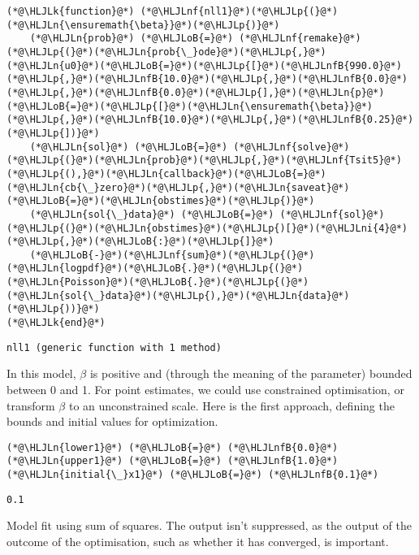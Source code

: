 \documentclass[12pt,a4paper]{article}
\newcommand{\HLJLk}[1]{\textcolor[RGB]{148,91,176}{\textbf{#1}}}
\newcommand{\HLJLn}[1]{#1}
\newcommand{\HLJLnf}[1]{\textcolor[RGB]{66,102,213}{#1}}
\newcommand{\HLJLnfB}[1]{\textcolor[RGB]{59,151,46}{#1}}
\newcommand{\HLJLni}[1]{\textcolor[RGB]{59,151,46}{#1}}
\newcommand{\HLJLoB}[1]{\textcolor[RGB]{102,102,102}{\textbf{#1}}}
\newcommand{\HLJLp}[1]{#1}
\begin{document}
\begin{lstlisting}
(*@\HLJLk{function}@*) (*@\HLJLnf{nll1}@*)(*@\HLJLp{(}@*)(*@\HLJLn{\ensuremath{\beta}}@*)(*@\HLJLp{)}@*)
    (*@\HLJLn{prob}@*) (*@\HLJLoB{=}@*) (*@\HLJLnf{remake}@*)(*@\HLJLp{(}@*)(*@\HLJLn{prob{\_}ode}@*)(*@\HLJLp{,}@*)(*@\HLJLn{u0}@*)(*@\HLJLoB{=}@*)(*@\HLJLp{[}@*)(*@\HLJLnfB{990.0}@*)(*@\HLJLp{,}@*)(*@\HLJLnfB{10.0}@*)(*@\HLJLp{,}@*)(*@\HLJLnfB{0.0}@*)(*@\HLJLp{,}@*)(*@\HLJLnfB{0.0}@*)(*@\HLJLp{],}@*)(*@\HLJLn{p}@*)(*@\HLJLoB{=}@*)(*@\HLJLp{[}@*)(*@\HLJLn{\ensuremath{\beta}}@*)(*@\HLJLp{,}@*)(*@\HLJLnfB{10.0}@*)(*@\HLJLp{,}@*)(*@\HLJLnfB{0.25}@*)(*@\HLJLp{])}@*)
    (*@\HLJLn{sol}@*) (*@\HLJLoB{=}@*) (*@\HLJLnf{solve}@*)(*@\HLJLp{(}@*)(*@\HLJLn{prob}@*)(*@\HLJLp{,}@*)(*@\HLJLnf{Tsit5}@*)(*@\HLJLp{(),}@*)(*@\HLJLn{callback}@*)(*@\HLJLoB{=}@*)(*@\HLJLn{cb{\_}zero}@*)(*@\HLJLp{,}@*)(*@\HLJLn{saveat}@*)(*@\HLJLoB{=}@*)(*@\HLJLn{obstimes}@*)(*@\HLJLp{)}@*)
    (*@\HLJLn{sol{\_}data}@*) (*@\HLJLoB{=}@*) (*@\HLJLnf{sol}@*)(*@\HLJLp{(}@*)(*@\HLJLn{obstimes}@*)(*@\HLJLp{)[}@*)(*@\HLJLni{4}@*)(*@\HLJLp{,}@*)(*@\HLJLoB{:}@*)(*@\HLJLp{]}@*)
    (*@\HLJLoB{-}@*)(*@\HLJLnf{sum}@*)(*@\HLJLp{(}@*)(*@\HLJLn{logpdf}@*)(*@\HLJLoB{.}@*)(*@\HLJLp{(}@*)(*@\HLJLn{Poisson}@*)(*@\HLJLoB{.}@*)(*@\HLJLp{(}@*)(*@\HLJLn{sol{\_}data}@*)(*@\HLJLp{),}@*)(*@\HLJLn{data}@*)(*@\HLJLp{))}@*)
(*@\HLJLk{end}@*)
\end{lstlisting}

\begin{lstlisting}
nll1 (generic function with 1 method)
\end{lstlisting}


In this model, \ensuremath{\beta} is positive and (through the meaning of the parameter) bounded between 0 and 1. For point estimates, we could use constrained optimisation, or transform \ensuremath{\beta} to an unconstrained scale. Here is the first approach, defining the bounds and initial values for optimization.


\begin{lstlisting}
(*@\HLJLn{lower1}@*) (*@\HLJLoB{=}@*) (*@\HLJLnfB{0.0}@*)
(*@\HLJLn{upper1}@*) (*@\HLJLoB{=}@*) (*@\HLJLnfB{1.0}@*)
(*@\HLJLn{initial{\_}x1}@*) (*@\HLJLoB{=}@*) (*@\HLJLnfB{0.1}@*)
\end{lstlisting}

\begin{lstlisting}
0.1
\end{lstlisting}


Model fit using sum of squares. The output isn't suppressed, as the output of the outcome of the optimisation, such as whether it has converged, is important.
\end{document}
